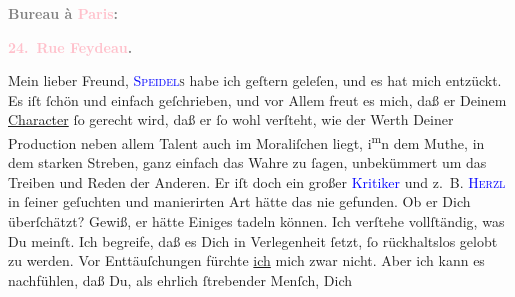            \pstart
           \begin{otherlanguage}{french}\textcolor{gray}{\textbf{\textbf{Bureau à \textcolor{pink}{Paris}{}\ledrightnote{\textcolor{pink}{Paris}}:}}}\end{otherlanguage}\pend
           \pstart
           \begin{otherlanguage}{french}\textcolor{gray}{\textbf{\textbf{\textcolor{pink}{24. Rue Feydeau}{}\ledrightnote{\textcolor{pink}{rue Feydeau}}.}}}\end{otherlanguage}\pend
           \pstart\center{}Mein lieber Freund,\pend\pstart
           \textsc{\textcolor{blue}{Speidel}{}\ledrightnote{\textcolor{blue}{Ludwig Speidel}}s}{ }\label{K_L02753-1v}\label{K_L02753-1h} habe ich geſtern geleſen, und es hat mich entzückt. Es iſt ſchön
               und einfach geſchrieben, und vor Allem freut es mich, daß er Deinem \uline{Character} ſo gerecht wird, daß er ſo wohl verſteht,
               wie der Werth Deiner Production  neben allem Talent auch im Moraliſchen liegt, i\substVorne{}\textsuperscript{m}\substDazwischen{}n\substHinten{} dem Muthe, in dem starken Streben, ganz einfach das Wahre zu ſagen, {\pb}unbekümmert um  das Treiben und Reden der Anderen. Er iſt doch ein großer \textcolor{blue}{Kritiker}{} und z. B. \textsc{\textcolor{blue}{Herzl}{}\ledrightnote{\textcolor{blue}{Theodor Herzl}}} in ſeiner geſuchten und manierirten Art hätte das nie gefunden. Ob er Dich
               überſchätzt? Gewiß, er hätte Einiges tadeln können. Ich verſtehe vollſtändig, was Du
               meinſt. Ich begreife, daß es Dich in Verlegenheit ſetzt, ſo rückhaltslos gelobt zu
               werden. Vor Enttäuſchungen fürchte \uline{ich} mich zwar
               nicht. Aber ich kann es nachfühlen, daß Du, als ehrlich ſtrebender Menſch, Dich
